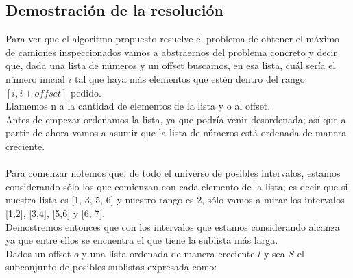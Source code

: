 \subsection{Demostraci\'on de la resoluci\'on}

Para ver que el algoritmo propuesto resuelve el problema de obtener el m\'aximo de camiones inspeccionados vamos a abstraernos del problema concreto y decir que, dada una lista de n\'umeros y un offset buscamos, en esa lista, cu\'al ser\'ia el n\'umero inicial $i$ tal que haya m\'as elementos que est\'en dentro del rango $[i, i+offset]$ pedido.\\
Llamemos n a la cantidad de elementos de la lista y o al offset. \\

Antes de empezar ordenamos la lista, ya que podr\'ia venir desordenada; as\'i que a partir de ahora vamos a asumir que la lista de n\'umeros est\'a ordenada de manera creciente. \\ \\

Para comenzar notemos que, de todo el universo de posibles intervalos, estamos considerando s\'olo los que comienzan con cada elemento de la lista; es decir que si nuestra lista es [1, 3, 5, 6] y nuestro rango es 2, s\'olo vamos a mirar los intervalos [1,2], [3,4], [5,6] y [6, 7].\\
Demostremos entonces que con los intervalos que estamos considerando alcanza ya que entre ellos se encuentra el que tiene la sublista m\'as larga.\\
Dados un offset $o$ y una lista ordenada de manera creciente $l$ y sea $S$ el subconjunto de posibles sublistas expresada como: \\

